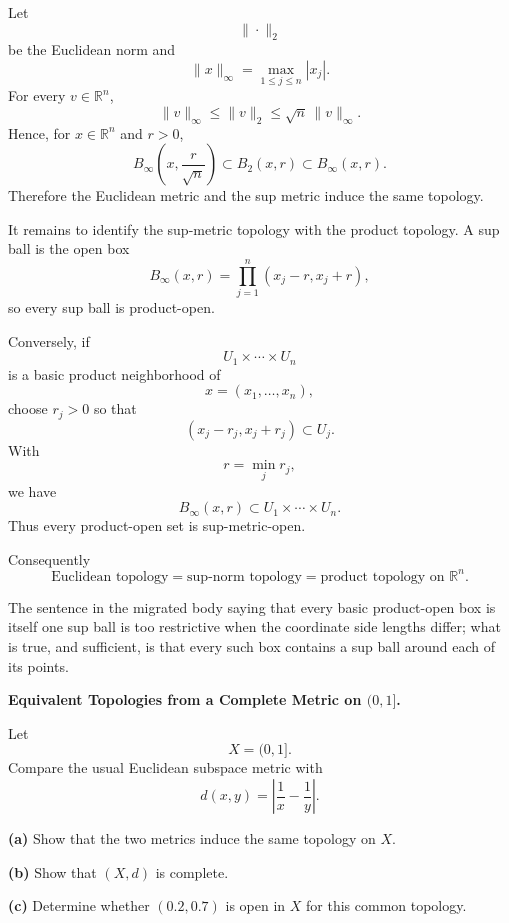 \begin{solution}
Let
\[
\|\cdot\|_2
\]
be the Euclidean norm and
\[
\|x\|_\infty=\max_{1\le j\le n}|x_j|.
\]
For every \(v\in\mathbb R^n\),
\[
\boxed{
\|v\|_\infty
\le
\|v\|_2
\le
\sqrt n\,\|v\|_\infty.
}
\]
Hence, for \(x\in\mathbb R^n\) and \(r>0\),
\[
B_\infty\left(x,\frac{r}{\sqrt n}\right)
\subset
B_2(x,r)
\subset
B_\infty(x,r).
\]
Therefore the Euclidean metric and the sup metric induce the same topology.

It remains to identify the sup-metric topology with the product topology. A sup ball is the open box
\[
B_\infty(x,r)
=
\prod_{j=1}^{n}(x_j-r,x_j+r),
\]
so every sup ball is product-open.

Conversely, if
\[
U_1\times\cdots\times U_n
\]
is a basic product neighborhood of
\[
x=(x_1,\ldots,x_n),
\]
choose \(r_j>0\) so that
\[
(x_j-r_j,x_j+r_j)\subset U_j.
\]
With
\[
r=\min_j r_j,
\]
we have
\[
B_\infty(x,r)
\subset
U_1\times\cdots\times U_n.
\]
Thus every product-open set is sup-metric-open.

Consequently
\[
\boxed{
\text{Euclidean topology}
=
\text{sup-norm topology}
=
\text{product topology on }\mathbb R^n.
}
\]

The sentence in the migrated body saying that every basic product-open box is itself one sup ball is too restrictive when the coordinate side lengths differ; what is true, and sufficient, is that every such box contains a sup ball around each of its points.
\end{solution}


\begin{problem}[CP-II-0365]
\label{prob:cp-ii-0365}
\textbf{Equivalent Topologies from a Complete Metric on \((0,1]\).}

\hspace*{1.5em}Let
\[
X=(0,1].
\]
Compare the usual Euclidean subspace metric with
\[
d(x,y)=\left|\frac1x-\frac1y\right|.
\]

\par\smallskip\noindent\textbf{(a)}\quad
Show that the two metrics induce the same topology on \(X\).

\par\smallskip\noindent\textbf{(b)}\quad
Show that \((X,d)\) is complete.

\par\smallskip\noindent\textbf{(c)}\quad
Determine whether \((0.2,0.7)\) is open in \(X\) for this common topology.
\end{problem}

